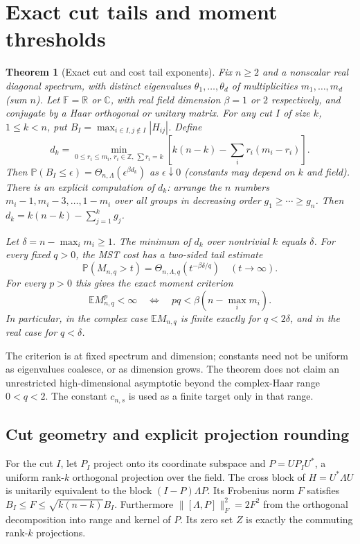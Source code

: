 \documentclass[11pt]{article}
\newtheorem{theorem}{Theorem}
\begin{document}
\section{Exact cut tails and moment thresholds}\label{exact-cut-tails-and-moment-thresholds}

\begin{theorem}[Exact cut and cost tail exponents] Fix \(n\ge2\) and a nonscalar real diagonal spectrum, with distinct eigenvalues \(\theta_1,\ldots,\theta_d\) of multiplicities \(m_1,\ldots,m_d\) (sum \(n\)). Let \(\mathbb F=\mathbb R\) or \(\mathbb C\), with real field dimension \(\beta=1\) or \(2\) respectively, and conjugate by a Haar orthogonal or unitary matrix. For any cut \(I\) of size \(k\), \(1\le k<n\), put \(B_I=\max_{i\in I,j\notin I}|H_{ij}|\). Define \[d_k=\min_{0\le r_i\le m_i,\,r_i\in\mathbb Z,\,\sum r_i=k}\left[k(n-k)-\sum_i r_i(m_i-r_i)\right].\] Then \(\mathbb P(B_I\le\epsilon)=\Theta_{n,\Lambda}(\epsilon^{\beta d_k})\) as \(\epsilon\downarrow0\) (constants may depend on \(k\) and field). There is an explicit computation of \(d_k\): arrange the \(n\) numbers \(m_i-1,m_i-3,\ldots,1-m_i\) over all groups in decreasing order \(g_1\ge\cdots\ge g_n\). Then \(d_k=k(n-k)-\sum_{j=1}^k g_j\).

Let \(\delta=n-\max_i m_i\ge1\). The minimum of \(d_k\) over nontrivial \(k\) equals \(\delta\). For every fixed \(q>0\), the MST cost has a two-sided tail estimate \[\mathbb P(M_{n,q}>t)=\Theta_{n,\Lambda,q}(t^{-\beta\delta/q})\quad(t\to\infty).\] For every \(p>0\) this gives the exact moment criterion \[\mathbb E M_{n,q}^{p}<\infty \quad\Longleftrightarrow\quad p q<\beta(n-\max_i m_i).\] In particular, in the complex case \(\mathbb E M_{n,q}\) is finite exactly for \(q<2\delta\), and in the real case for \(q<\delta\). \end{theorem}

The criterion is at fixed spectrum and dimension; constants need not be uniform as eigenvalues coalesce, or as dimension grows. The theorem does not claim an unrestricted high-dimensional asymptotic beyond the complex-Haar range $0<q<2$. The constant $c_{n,s}$ is used as a finite target only in that range.

\subsection{Cut geometry and explicit projection rounding}\label{cut-geometry-and-explicit-projection-rounding}

For the cut \(I\), let \(P_I\) project onto its coordinate subspace and \(P=U P_I U^*\), a uniform rank-\(k\) orthogonal projection over the field. The cross block of \(H=U^*\Lambda U\) is unitarily equivalent to the block \((I-P)\Lambda P\). Its Frobenius norm \(F\) satisfies \(B_I\le F\le\sqrt{k(n-k)} B_I\). Furthermore \(\|[\Lambda,P]\|_F^2=2F^2\) from the orthogonal decomposition into range and kernel of \(P\). Its zero set \(Z\) is exactly the commuting rank-\(k\) projections.
\end{document}
